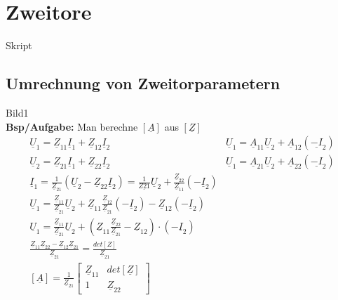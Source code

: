 \section{Zweitore}
Skript\\
\subsection{Umrechnung von Zweitorparametern}
Bild1\\
\textbf{Bsp/Aufgabe:} Man berechne $[\underline{A}]$ aus $[\underline{Z}]$\\

\begin{align}
	\underline{U}_1=\underline{Z}_{11}\underline{I}_1+\underline{Z}_{12}\underline{I}_2
	&
	\underline{U}_1=\underline{A}_{11}\underline{U}_2+\underline{A}_{12}(\underline{-I}_2)\nonumber\\
	\underline{U}_2=\underline{Z}_{21}\underline{I}_1+\underline{Z}_{22}\underline{I}_2
	&
	\underline{U}_1=\underline{A}_{21}\underline{U}_2+\underline{A}_{22}(\underline{-I}_2)\nonumber\\
	\underline{I}_1=\frac{1}{\underline{Z}_{21}}\left(\underline{U}_2-\underline{Z}_{22}\underline{I}_2\right)=\frac{1}{\underline{Z{21}}}\underline{U}_2+\frac{\underline{Z}_{22}}{\underline{Z}_{11}}\left(-\underline{I}_2\right)\nonumber\\
	\underline{U}_1=\frac{\underline{Z}_{11}}{\underline{Z}_{21}}\underline{U}_2+\underline{Z}_{11}\frac{\underline{Z}_{12}}{\underline{Z}_{21}}\left(-\underline{I}_2\right)-\underline{Z}_{12}\left(-\underline{I}_2\right)\nonumber\\
	\underline{U}_1=\frac{\underline{Z}_{11}}{\underline{Z}_{21}}\underline{U}_2+\left(\underline{Z}_{11}\frac{\underline{Z}_{22}}{\underline{Z}_{21}}-\underline{Z}_{12}\right)\cdot\left(-\underline{I}_2\right)\nonumber\\
	\frac{\underline{Z}_{11}\underline{Z}_{22}-\underline{Z}_{12}\underline{Z}_{21}}{\underline{Z}_{21}}=\frac{det[Z]}{\underline{Z}_{21}}\nonumber\\
	[\underline{A}]=\frac{1}{\underline{Z}_{21}}
	\begin{bmatrix}
		\underline{Z}_{11} & det[\underline{Z}]\\
		1 & \underline{Z}_{22}
	\end{bmatrix}\nonumber
\end{align}

